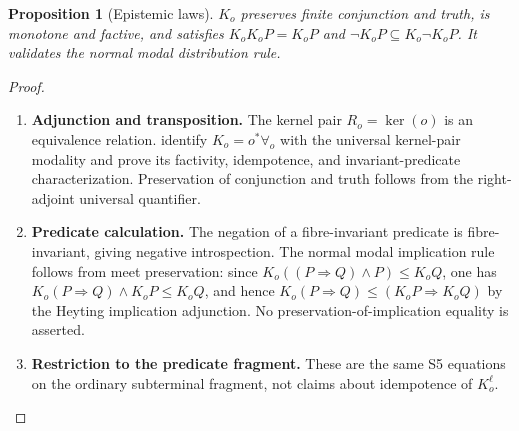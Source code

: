 \documentclass[11pt,a4paper]{article}
\numberwithin{equation}{section}
\newtheorem{proposition}[theorem]{Proposition}
\theoremstyle{definition}
\theoremstyle{remark}
\theoremstyle{plain}
\begin{document}
\begin{proposition}[Epistemic laws]
\label{agt-prop-S5}
$K_o$ preserves finite conjunction and truth, is monotone and factive, and
satisfies $K_oK_oP=K_oP$ and
$\neg K_oP\subseteq K_o\neg K_oP$. It validates the normal modal
distribution rule.
\end{proposition}
\begin{proof}
\leavevmode
\begin{enumerate}[label=\textup{(\arabic*)},leftmargin=*,itemsep=4pt,topsep=3pt]
  \item \textbf{Adjunction and transposition.} The kernel pair $R_o=\ker(o)$ is an equivalence relation. 
identify $K_o=o^*\forall_o$ with the universal kernel-pair modality
and prove its factivity, idempotence, and invariant-predicate
characterization. Preservation of conjunction and truth follows from the right-adjoint
universal quantifier.
  \item \textbf{Predicate calculation.} The negation of a fibre-invariant predicate is
fibre-invariant, giving negative introspection. The normal modal
implication rule follows from meet preservation: since
$K_o((P\Rightarrow Q)\wedge P)\leq K_oQ$, one has
$K_o(P\Rightarrow Q)\wedge K_oP\leq K_oQ$, and hence
$K_o(P\Rightarrow Q)\leq(K_oP\Rightarrow K_oQ)$ by the Heyting
implication adjunction. No preservation-of-implication equality is asserted.
  \item \textbf{Restriction to the predicate fragment.} These are the same S5 equations on the ordinary
subterminal fragment, not claims about idempotence of $K_o^\ell$.
\end{enumerate}
\end{proof}
\end{document}
